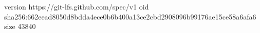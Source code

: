 version https://git-lfs.github.com/spec/v1
oid sha256:662eead8050d8bdda4ece0b6b400a13ce2cbd2908096b99176ae15ce58a6afa6
size 43840
